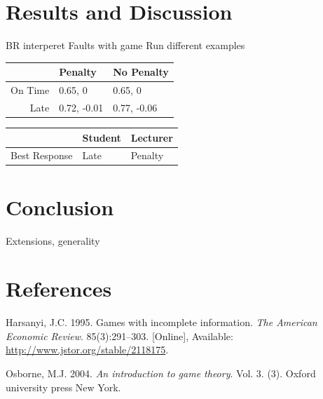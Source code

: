 \documentclass[11pt,preprint, authoryear]{elsarticle}
\let\origtable\table
\let\endorigtable\endtable
\renewenvironment{table}[1][2] {
    \expandafter\origtable\expandafter[H]
} {
    \endorigtable
}
\numberwithin{equation}{section}
\numberwithin{figure}{section}
\numberwithin{table}{section}
\newlength{\cslhangindent}
\newenvironment{CSLReferences}%
  {\setlength{\parindent}{0pt}%
  \everypar{\setlength{\hangindent}{\cslhangindent}}\ignorespaces}%
  {\par}
\begin{document}
\hypertarget{results-and-discussion}{%
\section{\texorpdfstring{Results and Discussion
\label{result}}{Results and Discussion }}\label{results-and-discussion}}

BR interperet Faults with game Run different examples

\begin{table}[H]
\centering
\begin{tabular}{rll}
  \toprule
 & Penalty & No Penalty \\ 
  \midrule
On Time & 0.65, 0 & 0.65, 0 \\ 
  Late & 0.72, -0.01 & 0.77, -0.06 \\ 
   \bottomrule
\end{tabular}
\caption{Simultaneous Game Best Response \label{tab2}} 
\end{table}
\begin{table}[H]
\centering
\begin{tabular}{rll}
  \toprule
 & Student & Lecturer \\ 
  \midrule
Best Response & Late & Penalty \\ 
   \bottomrule
\end{tabular}
\caption{Best Response\label{tab3}} 
\end{table}

\hypertarget{conclusion}{%
\section{\texorpdfstring{Conclusion
\label{con}}{Conclusion }}\label{conclusion}}

Extensions, generality \newpage

\hypertarget{references}{%
\section*{References}\label{references}}

\hypertarget{refs}{}
\begin{CSLReferences}{1}{0}
\leavevmode\hypertarget{ref-harsanyi}{}%
Harsanyi, J.C. 1995. Games with incomplete information. \emph{The
American Economic Review}. 85(3):291--303. {[}Online{]}, Available:
\url{http://www.jstor.org/stable/2118175}.

\leavevmode\hypertarget{ref-book}{}%
Osborne, M.J. 2004. \emph{An introduction to game theory}. Vol. 3. (3).
Oxford university press New York.

\end{CSLReferences}
\end{document}
